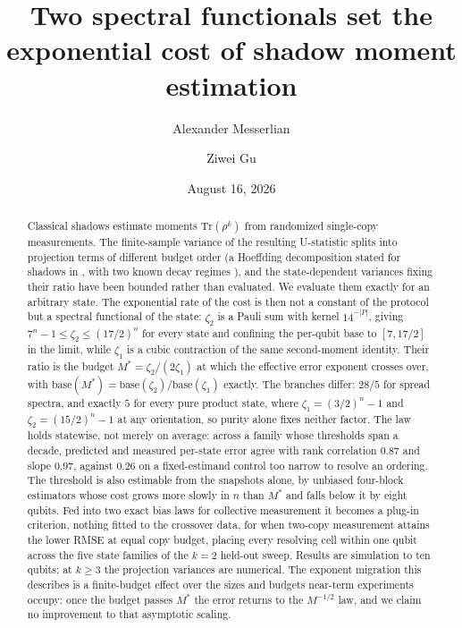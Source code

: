 \documentclass[a4paper,superscriptaddress,nofootinbib,onecolumn,nopdfoutputerror]{quantumarticle}
\begin{document}
\title{Two spectral functionals set the exponential cost of shadow moment estimation}

\author{Alexander Messerlian}
\author{Ziwei Gu}

\date{August 16, 2026}

\begin{abstract}
Classical shadows estimate moments \(\mathrm{Tr}(\rho^k)\) from randomized single-copy
measurements. The finite-sample variance of the resulting U-statistic splits into projection terms
of different budget order (a Hoeffding decomposition \cite{hoeffding1948, serfling1980} stated
for shadows in \cite{huang2020shadows}, with two known decay regimes
\cite{elben2020mixed, aasen2026limitations}), and the state-dependent variances fixing their
ratio have been bounded rather than evaluated. We evaluate them exactly for an arbitrary state.
The exponential rate of the cost is then not a constant of the protocol but a spectral functional
of the state: \(\zeta_2\) is a Pauli sum with kernel \(14^{-|P|}\), giving
\(7^n - 1 \le \zeta_2 \le (17/2)^n\) for every state and confining the per-qubit base to
\([7, 17/2]\) in the limit, while \(\zeta_1\) is a cubic contraction of the same second-moment
identity. Their ratio is the budget \(M^* = \zeta_2/(2\zeta_1)\) at which the effective error
exponent crosses over, with
\(\mathrm{base}(M^*) = \mathrm{base}(\zeta_2)/\mathrm{base}(\zeta_1)\) exactly. The branches
differ: \(28/5\) for spread spectra, and exactly \(5\) for every pure product state, where
\(\zeta_1 = (3/2)^n - 1\) and \(\zeta_2 = (15/2)^n - 1\) at any orientation, so purity alone
fixes neither factor. The law holds statewise, not merely on average: across a family whose
thresholds span a decade, predicted and measured per-state error agree with rank correlation
\(0.87\) and slope \(0.97\), against \(0.26\) on a fixed-estimand control too narrow to resolve
an ordering. The threshold is also estimable from the snapshots alone, by unbiased four-block
estimators whose cost grows more slowly in \(n\) than \(M^*\) and falls below it by eight
qubits. Fed into two exact bias laws for collective measurement it becomes a plug-in criterion,
nothing fitted to the crossover data, for when two-copy measurement attains the lower RMSE at
equal copy budget, placing every resolving cell within one qubit across the five state families
of the \(k = 2\) held-out sweep.
Results are simulation to ten qubits; at \(k \ge 3\) the projection variances are numerical.
The exponent migration this describes is a finite-budget effect over the sizes and budgets
near-term experiments occupy: once the budget passes \(M^*\) the error returns to the
\(M^{-1/2}\) law, and we claim no improvement to that asymptotic scaling.
\end{abstract}
\end{document}
